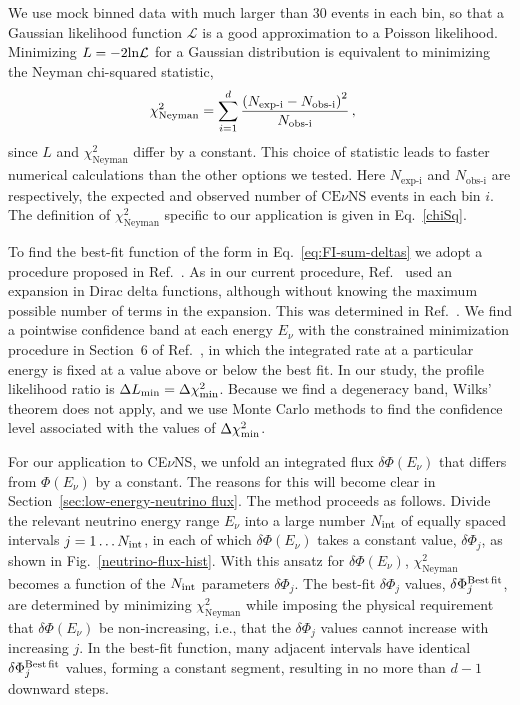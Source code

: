 \documentclass[a4paper,11pt]{article}
\renewcommand\({\left(}
\renewcommand\){\right)}
\renewcommand\[{\left[}
\renewcommand\]{\right]}
\newcommand{\tx}{\text}
\newcommand{\al}[1]{\begin{align}#1\end{align}}
\newcommand{\paren}[1]{\left(#1\right)}
\newcommand{\pn}[1]{\left(#1\right)}
\newcommand{\fn}[1]{\!\paren{#1}} %
\theoremstyle{definition}
\newcommand{\ov}{\over}
\newcommand{\CEnNS}{\text{CE}\nu\text{NS}}
\begin{document}
We use mock binned data with much larger than 30 events in each bin, so that a Gaussian likelihood function $\mathcal{L}$ is a good approximation to a Poisson likelihood. 
Minimizing  $ L = - 2 {\rm ln} \mathcal{L}$ for a Gaussian distribution is equivalent to minimizing the Neyman chi-squared statistic, 
\al{
    \chi^2_{\tx{Neyman}} &= 
    \sum_{i=1}^{d}{\pn{N_{\tx{exp-i}} - N_{\tx{obs-i}}}^2\ov N_{\tx{obs-i}}}\,,
}
since $L$ and $\chi^2_{\tx{Neyman}}$ differ by a constant.
This choice of statistic leads to faster numerical calculations than the other options we tested. 
Here $N_{\tx{exp-i}}$ and $N_{\tx{obs-i}}$ are respectively, the expected and observed number of $\CEnNS$ events in each bin $i$. The definition of 
$\chi^2_{\tx{Neyman}}$ specific to our application is given in Eq.~\eqref{chiSq}.

To find the best-fit function of the form in Eq.~\eqref{eq:FI-sum-deltas} we adopt a procedure proposed 
in Ref.~\cite{Feldstein:2014gza}. 
As in our current procedure, Ref.~\cite{Feldstein:2014gza} used an expansion in Dirac delta functions, although without knowing the maximum possible number of terms in the expansion. This was determined in Ref.~\cite{Gelmini:2017aqe}.
 We find a pointwise confidence band at each energy $E_\nu$  with the constrained minimization procedure in Section~6 of Ref.~\cite{Gelmini:2017aqe}, in which the integrated rate at a particular energy is fixed at a value 
above or below the best fit. 
In our study, the profile likelihood ratio is $\Delta L_{\rm min}= \Delta \chi^2_{\rm min}$.  
Because we find a degeneracy band, Wilks' theorem does not apply, and we use Monte Carlo methods to find the confidence level associated with the values of $\Delta \chi^2_{\rm min}$. 

For our application to CE$\nu$NS, we unfold
an integrated flux $\delta\Phi\fn{E_\nu}$ that differs from $\Phi\fn{E_\nu}$ by a constant. 
The reasons for this will become clear in Section~\ref{sec:low-energy-neutrino flux}. The method proceeds as follows. Divide the relevant neutrino energy range $E_\nu$ into a large number $N_{\rm int}$ of equally spaced intervals $j=1 \dots  N_{\rm int}$, in each of which $\delta\Phi(E_\nu)$ takes a constant value, $\delta\Phi_j$, as shown in Fig.~\ref{neutrino-flux-hist}. With this ansatz for $\delta\Phi(E_\nu)$, $\chi^2_{\tx{Neyman}}$ becomes a function of the $N_{\rm int}$ parameters $\delta\Phi_j$. The best-fit $\delta\Phi_j$ values, $\delta\Phi^{\rm Best\,fit}_j$, are determined by minimizing $\chi^2_{\tx{Neyman}}$ while imposing the physical requirement that $\delta\Phi(E_\nu)$ be non-increasing, i.e., that the $\delta\Phi_j$ values cannot increase with increasing $j$. In the best-fit function, many adjacent intervals have identical $\delta\Phi^{\rm Best\,fit}_j$ values, forming a constant segment, resulting in no more than $d-1$ downward steps. 
\end{document}
